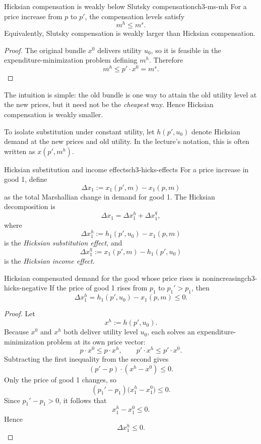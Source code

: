 \begin{theorem}{Hicksian compensation is weakly below Slutsky compensation}{ch3-ms-mh}
For a price increase from $p$ to $p'$, the compensation levels satisfy
\[
m^h \le m^s.
\]
Equivalently, Slutsky compensation is weakly larger than Hicksian compensation.
\end{theorem}

\begin{proof}
The original bundle $x^0$ delivers utility $u_0$, so it is feasible in the expenditure-minimization problem defining $m^h$. Therefore
\[
m^h \le p' \cdot x^0 = m^s.
\]
\end{proof}

\begin{examtip}
The intuition is simple: the old bundle is one way to attain the old utility level at the new prices, but it need not be the \emph{cheapest} way. Hence Hicksian compensation is weakly smaller.
\end{examtip}

To isolate substitution under constant utility, let $h(p',u_0)$ denote Hicksian demand at the new prices and old utility. In the lecture's notation, this is often written as $x(p',m^h)$.

\begin{definition}{Hicksian substitution and income effects}{ch3-hicks-effects}
For a price increase in good 1, define
\[
\Delta x_1 := x_1(p',m) - x_1(p,m)
\]
as the total Marshallian change in demand for good 1. The Hicksian decomposition is
\[
\Delta x_1 = \Delta x_1^h + \Delta x_1^q,
\]
where
\[
\Delta x_1^h := h_1(p',u_0) - x_1(p,m)
\]
is the \emph{Hicksian substitution effect}, and
\[
\Delta x_1^q := x_1(p',m) - h_1(p',u_0)
\]
is the \emph{Hicksian income effect}.

\end{definition}

\begin{theorem}{Hicksian compensated demand for the good whose price rises is nonincreasing}{ch3-hicks-negative}
If the price of good 1 rises from $p_1$ to $p_1' > p_1$, then
\[
\Delta x_1^h = h_1(p',u_0) - x_1(p,m) \le 0.
\]
\end{theorem}

\begin{proof}
Let
\[
x^h := h(p',u_0).
\]
Because $x^0$ and $x^h$ both deliver utility level $u_0$, each solves an expenditure-minimization problem at its own price vector:
\[
p \cdot x^0 \le p \cdot x^h,
\qquad
p' \cdot x^h \le p' \cdot x^0.
\]
Subtracting the first inequality from the second gives
\[
(p'-p)\cdot(x^h-x^0)\le 0.
\]
Only the price of good 1 changes, so
\[
(p_1'-p_1)\bigl(x_1^h-x_1^0\bigr)\le 0.
\]
Since $p_1'-p_1>0$, it follows that
\[
x_1^h-x_1^0\le 0.
\]
Hence
\[
\Delta x_1^h\le 0.
\]
\end{proof}

